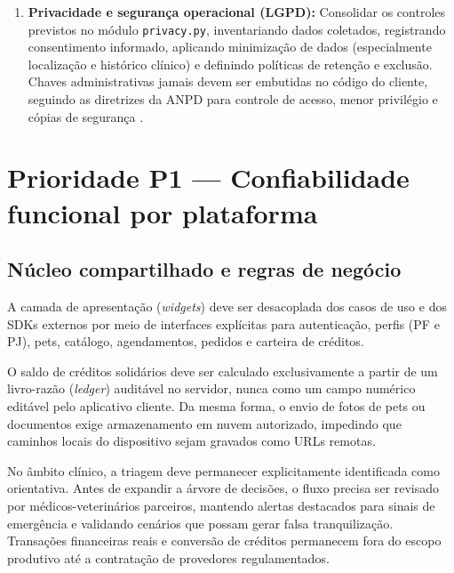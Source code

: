 \documentclass[12pt,a4paper]{article}
\begin{document}
\begin{enumerate}[leftmargin=*]
  \item \textbf{Privacidade e segurança operacional (LGPD):} Consolidar os controles previstos no módulo \texttt{privacy.py}, inventariando dados coletados, registrando consentimento informado, aplicando minimização de dados (especialmente localização e histórico clínico) e definindo políticas de retenção e exclusão. Chaves administrativas jamais devem ser embutidas no código do cliente, seguindo as diretrizes da ANPD para controle de acesso, menor privilégio e cópias de segurança \cite{anpd}.
\end{enumerate}

\section{Prioridade P1 --- Confiabilidade funcional por plataforma}

\subsection{Núcleo compartilhado e regras de negócio}
A camada de apresentação (\textit{widgets}) deve ser desacoplada dos casos de uso e dos SDKs externos por meio de interfaces explícitas para autenticação, perfis (PF e PJ), pets, catálogo, agendamentos, pedidos e carteira de créditos. 

O saldo de créditos solidários deve ser calculado exclusivamente a partir de um livro-razão (\textit{ledger}) auditável no servidor, nunca como um campo numérico editável pelo aplicativo cliente. Da mesma forma, o envio de fotos de pets ou documentos exige armazenamento em nuvem autorizado, impedindo que caminhos locais do dispositivo sejam gravados como URLs remotas.

No âmbito clínico, a triagem deve permanecer explicitamente identificada como orientativa. Antes de expandir a árvore de decisões, o fluxo precisa ser revisado por médicos-veterinários parceiros, mantendo alertas destacados para sinais de emergência e validando cenários que possam gerar falsa tranquilização. Transações financeiras reais e conversão de créditos permanecem fora do escopo produtivo até a contratação de provedores regulamentados.
\end{document}
